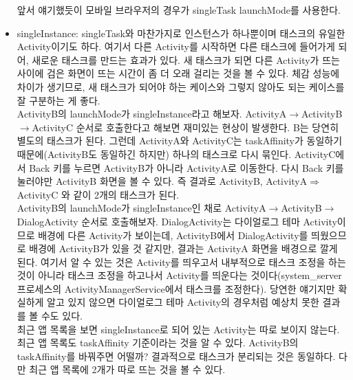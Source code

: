 \begin{itemize}
앞서 얘기했듯이 모바일 브라우저의 경우가 singleTask launchMode를 사용한다. 

\item singleInstance: singleTask와 마찬가지로 인스턴스가 하나뿐이며 태스크의 유일한 Activity이기도 하다. 
여기서 다른 Activity를 시작하면 다른 태스크에 들어가게 되어, 새로운 태스크를 만드는 효과가 있다. 
새 태스크가 되면 다른 Activity가 뜨는 사이에 검은 화면이 뜨는 시간이 좀 더 오래 걸리는 것을 볼 수 있다. 
체감 성능에 차이가 생기므로, 새 태스크가 되어야 하는 케이스와 그렇지 않아도 되는 케이스를 잘 구분하는 게 좋다.\\

ActivityB의 launchMode가 singleInstance라고 해보자. ActivityA$\rightarrow$ActivityB$\rightarrow$ActivityC 순서로 호출한다고 해보면 재미있는 현상이 발생한다. B는 당연히 별도의 태스크가 된다. 그런데 ActivityA와 ActivityC는 taskAffinity가 동일하기 때문에(ActivityB도 동일하긴 하지만) 하나의 태스크로 다시 묶인다. ActivityC에서 Back 키를 누르면 ActivityB가 아니라 ActivityA로 이동한다. 다시 Back 키를 눌러야만 ActivityB 화면을 볼 수 있다. 즉 결과로 ActivityB, ActivityA$\Rightarrow$ActivityC 와 같이 2개의 태스크가 된다.\\

ActivityB의 launchMode가 singleInstance인 채로 ActivityA$\rightarrow$ActivityB$\rightarrow$DialogActivity 순서로 호출해보자. 
DialogActivity는 다이얼로그 테마 Activity이므로 배경에 다른 Activity가 보이는데, ActivityB에서 DialogActivity를 띄웠으므로 배경에 ActivityB가 있을 것 같지만, 결과는 ActivityA 화면을 배경으로 깔게 된다.
여기서 알 수 있는 것은 Activity를 띄우고서 내부적으로 태스크 조정을 하는 것이 아니라 태스크 조정을 하고나서 Activity를 띄운다는 것이다(system\_server 프로세스의 ActivityManagerService에서 태스크를 조정한다). 당연한 얘기지만 확실하게 알고 있지 않으면 다이얼로그 테마 Activity의 경우처럼 예상치 못한 결과를 볼 수도 있다.\\

최근 앱 목록을 보면 singleInstance로 되어 있는 Activity는 따로 보이지 않는다. 최근 앱 목록도 taskAffinity 기준이라는 것을 알 수 있다.
ActivityB의 taskAffinity를 바꿔주면 어떨까? 결과적으로 태스크가 분리되는 것은 동일하다. 다만 최근 앱 목록에 2개가 따로 뜨는 것을 볼 수 있다.
\end{itemize}
